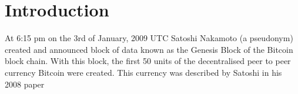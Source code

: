 \section{Introduction}
%
%



% 
% 
% 
% 

At 6:15 pm on the 3rd of January, 2009 UTC Satoshi Nakamoto (a pseudonym)
created and announced block of data known as the Genesis Block of the Bitcoin
block chain\cite{satoshi}. With this block, the first 50 units of the decentralised peer to
peer currency Bitcoin were created.  This currency was described by Satoshi in
his 2008 paper

